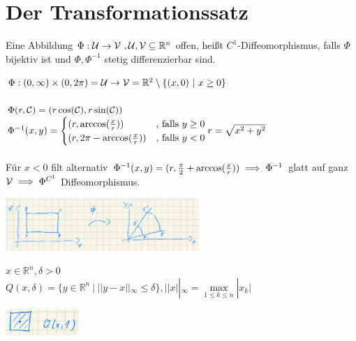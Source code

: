 \chapter{Der Transformationssatz}
  \begin{definition}
    Eine Abbildung $\Phi: \mathcal{U} \to \mathcal{V} \ ,\mathcal{U}, \mathcal{V} \subseteq \mathbb{R}^n$ offen, heißt $C^1$-Diffeomorphismus, falls $\Phi$ bijektiv ist und $\Phi, \Phi^{-1}$ stetig differenzierbar sind.
  \end{definition}

  \begin{example}
    $\Phi: (0, \infty) \times (0, 2\pi) = \mathcal{U} \to \mathcal{V} = \mathbb{R}^2 \setminus \{(x,0) \ | \ x \geq 0\}$\\
    \\
    $\Phi(r, \mathcal{C}) = (r \cos(\mathcal{C}), r \sin(\mathcal{C}))$\\
    $\Phi^{-1}(x,y) = \begin{cases}
      (r, \arccos(\frac{x}{r})) & \text{, falls } y \geq 0\\
      (r, 2\pi - \arccos(\frac{x}{r})) & \text{, falls } y < 0
    \end{cases}\\
    r = \sqrt{x^2 + y^2}$\\
    \\
    Für $x < 0$ filt alternativ $\Phi^{-1}(x,y) = (r, \frac{\pi}{2} + \arccos(\frac{x}{r}))\\
    \implies \Phi^{-1}$ glatt auf ganz $\mathcal{V} \implies \Phi^{C^1}$ Diffeomorphismus.
    \begin{center}
      \includegraphics[height=2cm]{img/VII_Bsp_1_Polarkoordinaten.png}
    \end{center}
  \end{example}

  \begin{remark}[Notation]
    $x \in \mathbb{R}^n, \delta >0$\\
    $Q(x, \delta) = \{y \in \mathbb{R}^n \ | \ ||y-x||_{\infty} \leq \delta\}, ||x||_{\infty} = \max\limits_{1 \leq k \leq n} | x_k |$
    \begin{center}
      \includegraphics[height=1cm]{img/VII_Notation_1_Qx1.png}
    \end{center}
  \end{remark}

